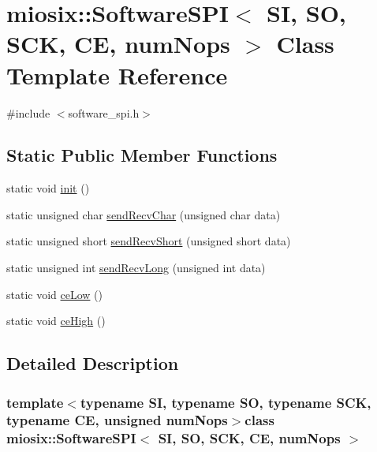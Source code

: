 \hypertarget{classmiosix_1_1_software_s_p_i}{\section{miosix\-:\-:Software\-S\-P\-I$<$ S\-I, S\-O, S\-C\-K, C\-E, num\-Nops $>$ Class Template Reference}
\label{classmiosix_1_1_software_s_p_i}
}


{\ttfamily \#include $<$software\-\_\-spi.\-h$>$}

\subsection*{Static Public Member Functions}
\begin{DoxyCompactItemize}
\item 
static void \hyperlink{classmiosix_1_1_software_s_p_i_a0d8dc57b9c5bbca82f830a286e1e43e3}{init} ()
\item 
static unsigned char \hyperlink{classmiosix_1_1_software_s_p_i_a28c74624fdf2699bbd9a16a0b4041df4}{send\-Recv\-Char} (unsigned char data)
\item 
static unsigned short \hyperlink{classmiosix_1_1_software_s_p_i_aa4087c723fe51f7172c54c24a51e56c3}{send\-Recv\-Short} (unsigned short data)
\item 
static unsigned int \hyperlink{classmiosix_1_1_software_s_p_i_a2338776e2f0242f95b8e416b269ae4e7}{send\-Recv\-Long} (unsigned int data)
\item 
static void \hyperlink{classmiosix_1_1_software_s_p_i_a357a64d9abe58149039a90813a0e710c}{ce\-Low} ()
\item 
static void \hyperlink{classmiosix_1_1_software_s_p_i_a7e2ba605d5a06df4e27c346f23b7559c}{ce\-High} ()
\end{DoxyCompactItemize}


\subsection{Detailed Description}
\subsubsection*{template$<$typename S\-I, typename S\-O, typename S\-C\-K, typename C\-E, unsigned num\-Nops$>$class miosix\-::\-Software\-S\-P\-I$<$ S\-I, S\-O, S\-C\-K, C\-E, num\-Nops $>$}


